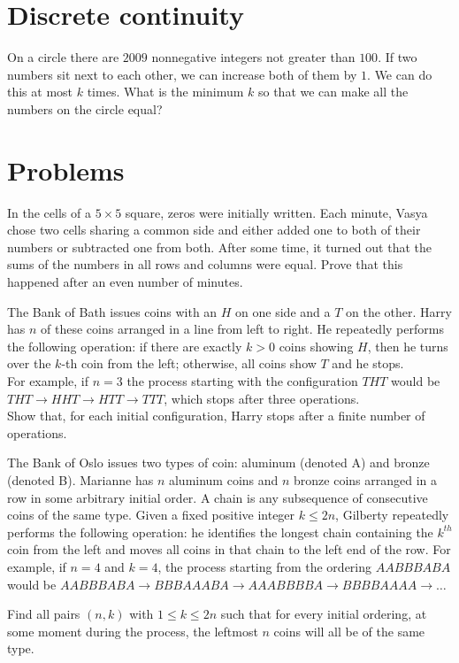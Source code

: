 \section{Discrete continuity}

\begin{example}[Russia 2009]
    On a circle there are $2009$ nonnegative integers not greater than $100$. If two numbers sit next to each other, we can increase both of them by $1$. We can do this at most $ k$ times. What is the minimum $ k$ so that we can make all the numbers on the circle equal?
\end{example}

\section{Problems}

\begin{problem} [Russia 2008]
In the cells of a $5 \times 5$ square, zeros were initially written. Each minute, Vasya chose two cells sharing a common side and either added one to both of their numbers or subtracted one from both. After some time, it turned out that the sums of the numbers in all rows and columns were equal. Prove that this happened after an even number of minutes.
\end{problem}

\begin{problem}[IMO 2019]
   The Bank of Bath issues coins with an $H$ on one side and a $T$ on the other. Harry has $n$ of these coins arranged in a line from left to right. He repeatedly performs the following operation: if there are exactly $k>0$ coins showing $H$, then he turns over the $k$-th coin from the left; otherwise, all coins show $T$ and he stops. \\ For example, if $n=3$ the process starting with the configuration $THT$ would be $THT \to HHT \to HTT \to TTT$, which stops after three operations. \\ Show that, for each initial configuration, Harry stops after a finite number of operations.
\end{problem}

\begin{problem}[IMO 2022]
    The Bank of Oslo issues two types of coin: aluminum (denoted A) and bronze (denoted B). Marianne has $n$ aluminum coins and $n$ bronze coins arranged in a row in some arbitrary initial order. A chain is any subsequence of consecutive coins of the same type. Given a fixed positive integer $k \leq 2n$, Gilberty repeatedly performs the following operation: he identifies the longest chain containing the $k^{th}$ coin from the left and moves all coins in that chain to the left end of the row. For example, if $n=4$ and $k=4$, the process starting from the ordering $AABBBABA$ would be $AABBBABA \to BBBAAABA \to AAABBBBA \to BBBBAAAA \to \dots$

    Find all pairs $(n,k)$ with $1 \leq k \leq 2n$ such that for every initial ordering, at some moment during the process, the leftmost $n$ coins will all be of the same type.
\end{problem}

